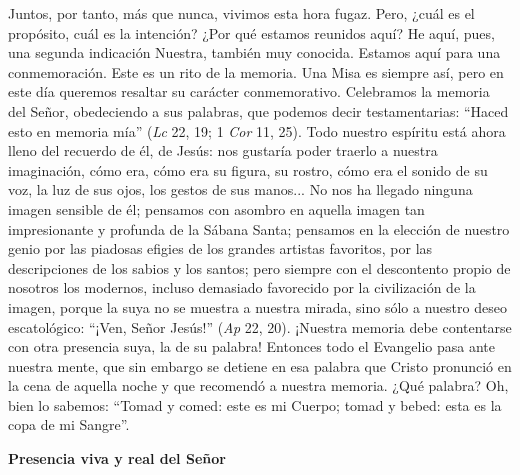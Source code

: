 			\begin{body}Juntos, por tanto, más que nunca, vivimos esta hora fugaz. Pero, ¿cuál es el propósito, cuál es la intención? ¿Por qué estamos reunidos aquí? He aquí, pues, una segunda indicación Nuestra, también muy conocida. Estamos aquí para una conmemoración. Este es un rito de la memoria. Una Misa es siempre así, pero en este día queremos resaltar su carácter conmemorativo. Celebramos la memoria del Señor, obedeciendo a sus palabras, que podemos decir testamentarias: “Haced esto en memoria mía” (\textit{Lc} 22, 19; 1 \textit{Cor} 11, 25). Todo nuestro espíritu está ahora lleno del recuerdo de él, de Jesús: nos gustaría poder traerlo a nuestra imaginación, cómo era, cómo era su figura, su rostro, cómo era el sonido de su voz, la luz de sus ojos, los gestos de sus manos... No nos ha llegado ninguna imagen sensible de él; pensamos con asombro en aquella imagen tan impresionante y profunda de la Sábana Santa; pensamos en la elección de nuestro genio por las piadosas efigies de los grandes artistas favoritos, por las descripciones de los sabios y los santos; pero siempre con el descontento propio de nosotros los modernos, incluso demasiado favorecido por la civilización de la imagen, porque la suya no se muestra a nuestra mirada, sino sólo a nuestro deseo escatológico: “¡Ven, Señor Jesús!” (\textit{Ap} 22, 20). ¡Nuestra memoria debe contentarse con otra presencia suya, la de su palabra! Entonces todo el Evangelio pasa ante nuestra mente, que sin embargo se detiene en esa palabra que Cristo pronunció en la cena de aquella noche y que recomendó a nuestra memoria. ¿Qué palabra? Oh, bien lo sabemos: “Tomad y comed: este es mi Cuerpo; tomad y bebed: esta es la copa de mi Sangre”. \end{body}
			
			\begin{bodycenter}\textbf{Presencia viva y real del Señor }\end{bodycenter}
			
